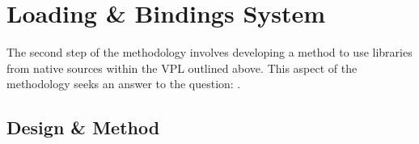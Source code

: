 



\section{Loading \& Bindings System} 
\label{sec:method-bindings}




The second step of the methodology involves developing a method to use libraries from native sources within the VPL outlined above. 
This aspect of the methodology seeks an answer to the question: \mySubRQThree.



\subsection{Design \& Method}

